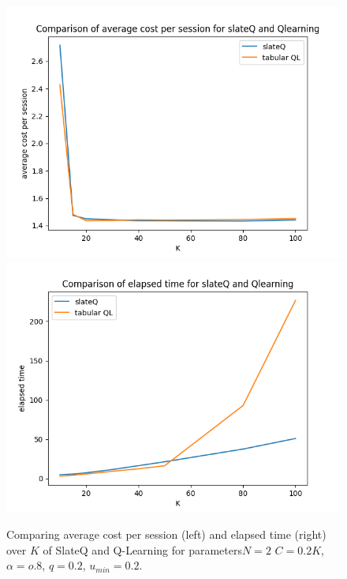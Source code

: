 \documentclass[12pt]{article}
\begin{document}
\begin{figure}[H] %
    \centering
    \includegraphics[width=0.49\linewidth]{Figure_1.png}
    \includegraphics[width=0.49\linewidth]{Figure_2.png}
    \caption{Comparing average cost per session (left) and elapsed time (right) over $K$ of SlateQ and Q-Learning for parameters$N=2$ $C=0.2K$, $\alpha = o.8$, $q= 0.2$, $u_{min} = 0.2$.}
\end{figure}
\end{document}
